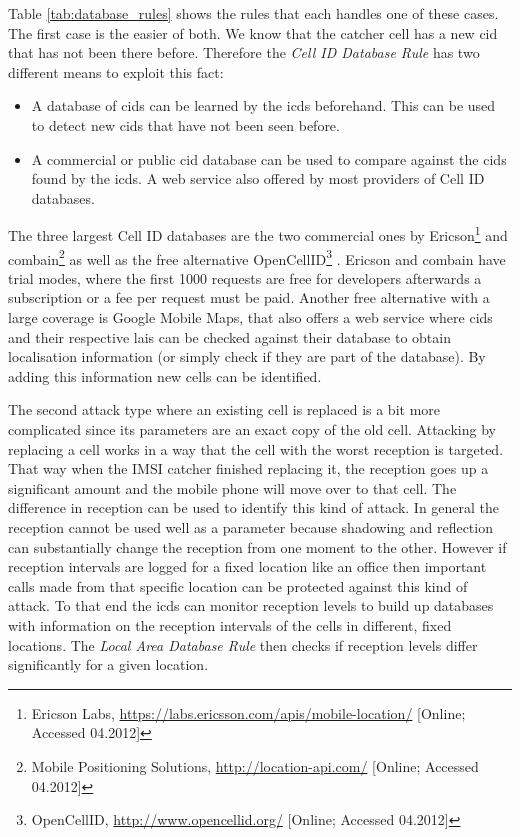 Table \ref{tab:database_rules} shows the rules that each handles one of these cases.
The first case is the easier of both.
We know that the catcher cell has a new \gls{cid} that has not been there before.
Therefore the \emph{Cell ID Database Rule} has two different means to exploit this fact:
\begin{itemize}
	\item A database of \glspl{cid} can be learned by the \gls{icds} beforehand. 
	This can be used to detect new \glspl{cid} that have not been seen before.
	\item A commercial or public \gls{cid} database can be used to compare against the \glspl{cid} found by the \gls{icds}.
	A web service also offered by most providers of Cell ID databases.
\end{itemize}
The three largest Cell ID databases are the two commercial ones by Ericson\footnote{Ericson Labs, \url{https://labs.ericsson.com/apis/mobile-location/} [Online; Accessed 04.2012]} and combain\footnote{Mobile Positioning Solutions, \url{http://location-api.com/} [Online; Accessed 04.2012]} as well as the free alternative OpenCellID\footnote{OpenCellID, \url{http://www.opencellid.org/} [Online; Accessed 04.2012]} \cite{wiki_cells}.
Ericson and combain have trial modes, where the first 1000 requests are free for developers afterwards a subscription or a fee per request must be paid.
Another free alternative with a large coverage is Google Mobile Maps, that also offers a web service where \glspl{cid} and their respective \glspl{lai} can be checked against their database to obtain localisation information (or simply check if they are part of the database).
By adding this information new cells can be identified.

The second attack type where an existing cell is replaced is a bit more complicated since its parameters are an exact copy of the old cell.
Attacking by replacing a cell works in a way that the cell with the worst reception is targeted.
That way when the IMSI catcher finished replacing it, the reception goes up a significant amount and the mobile phone will move over to that cell.
The difference in reception can be used to identify this kind of attack.
In general the reception cannot be used well as a parameter because shadowing and reflection can substantially change the reception from one moment to the other.
However if reception intervals are logged for a fixed location like an office then important calls made from that specific location can be protected against this kind of attack.
To that end the \gls{icds} can monitor reception levels to build up databases with information on the reception intervals of the cells in different, fixed locations.
The \emph{Local Area Database Rule} then checks if reception levels differ significantly for a given location.

